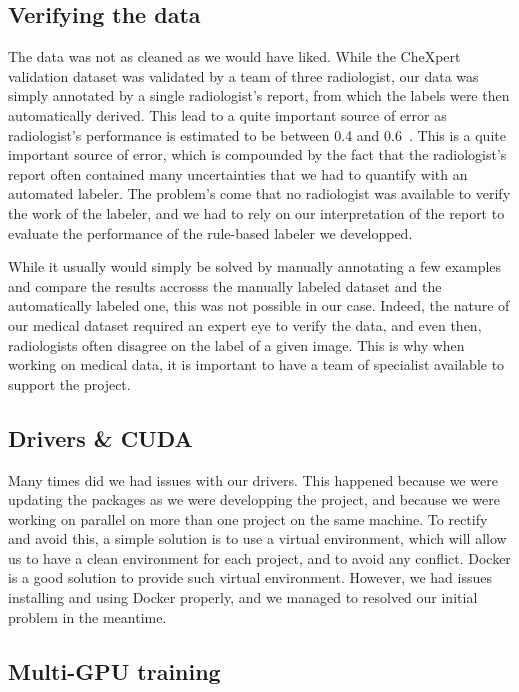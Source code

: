 \documentclass[11pt]{article}
\begin{document}
    \subsection{Verifying the data}
            The data was not as cleaned as we would have liked. While the CheXpert validation dataset was validated by a team of three radiologist, our data
            was simply annotated by a single radiologist's report, from which the labels were then automatically derived. This lead to a quite important source of error as radiologist's performance
            is estimated to be between 0.4 and 0.6~\cite{chexzero}. This is a quite important source of error, which is compounded
            by the fact that the radiologist's report often contained many uncertainties that we had
            to quantify with an automated labeler. The problem's come that no radiologist was available to verify the work of the labeler, and we had to rely on our interpretation of
            the report to evaluate the performance of the rule-based labeler we developped.

            While it usually would simply be solved by manually annotating a few examples and compare the results accrosss the manually labeled dataset
            and the automatically labeled one, this was not possible in our case. Indeed, the nature of our medical dataset required an expert eye to verify the data,
            and even then, radiologists often disagree on the label of a given image. This is why when working on medical data, it is important to have a team of specialist available to support the project.


    \subsection{Drivers \& CUDA}

        Many times did we had issues with our drivers. This happened because we were updating the packages as we were developping the project, and because we were working on parallel on more than one project
        on the same machine. To rectify and avoid this, a simple solution is to use a virtual environment, which will allow us to have a clean environment for each project, and to avoid any conflict. Docker
        is a good solution to provide such virtual environment. However, we had issues installing and using Docker properly, and we managed to resolved our initial problem in the meantime.

    \subsection{Multi-GPU training}
\end{document}
